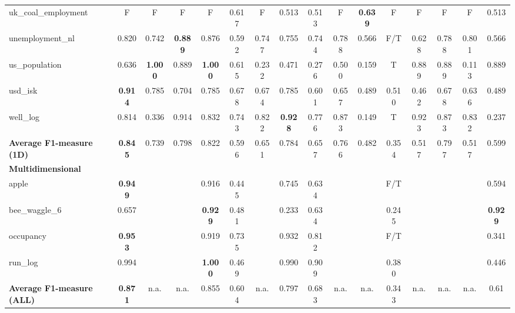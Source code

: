 \begin{table}
{\begin{tabular}{l|c|cccccccccccccc}
    \cellcolor{gray!100}uk\_coal\_employment & \cellcolor{gray!100}F & \cellcolor{gray!100}F & \cellcolor{gray!100}F & \cellcolor{gray!100}F & \cellcolor{gray!100}0.617 & \cellcolor{gray!100}F & \cellcolor{gray!100}0.513 & \cellcolor{gray!100}0.513 & \cellcolor{gray!100}F & \cellcolor{gray!100}\textbf{0.639} & \cellcolor{gray!100}F & \cellcolor{gray!100}F & \cellcolor{gray!100}F & \cellcolor{gray!100}F & \cellcolor{gray!100}0.513\\
    
    unemployment\_nl & 0.820 & 0.742 & \textbf{0.889} & 0.876 & 0.592 & 0.747 & 0.755 & 0.744 & 0.788 & 0.566 & F/T & 0.628 & 0.788 & 0.801 & 0.566\\
    
    us\_population & 0.636 & \textbf{1.000} & 0.889 & \textbf{1.000} & 0.615 & 0.232 & 0.471 & 0.276 & 0.500 & 0.159 & T & 0.889 & 0.889 & 0.113 & 0.889\\
    
    usd\_isk & \textbf{0.914} & 0.785 & 0.704 & 0.785 & 0.678 & 0.674 & 0.785 & 0.601 & 0.657 & 0.489 & 0.510 & 0.462 & 0.678 & 0.636 & 0.489\\
    
    well\_log & 0.814 & 0.336 & 0.914 & 0.832 & 0.743 & 0.822 & \textbf{0.928} & 0.776 & 0.873 & 0.149 & T & 0.923 & 0.873 & 0.832 & 0.237\\
    
    \midrule

    \textbf{Average F1-measure (1D)} & \textbf{0.845} & 0.739 & 0.798 & 0.822 & 0.596 & 0.651 & 0.784 & 0.657 & 0.766 & 0.482 & 0.354 & 0.517 & 0.797 & 0.517 & 0.599\\
    
    \midrule

    \multicolumn{16}{l}{\textbf{Multidimensional}} \\

    \midrule
    
    apple & \textbf{0.949} &  &  & 0.916 & 0.445 &  & 0.745 & 0.634 &  &  & F/T &  &  &  & 0.594\\
    
    bee\_waggle\_6 & 0.657 &  &  & \textbf{0.929} & 0.481 &  & 0.233 & 0.634 &  &  & 0.245 &  &  &  & \textbf{0.929}\\
    
    occupancy & \textbf{0.953} &  &  & 0.919 & 0.735 &  & 0.932 & 0.812 &  &  & F/T &  &  &  & 0.341\\
    
    run\_log & 0.994 &  &  & \textbf{1.000} & 0.469 &  & 0.990 & 0.909 &  &  & 0.380 &  &  &  & 0.446\\
    
    \midrule

    \textbf{Average F1-measure (ALL)} & \textbf{0.871} & n.a. & n.a. & 0.855 & 0.604 & n.a. & 0.797 & 0.683 & n.a. & n.a. & 0.343 & n.a. & n.a. & n.a. & 0.61\\
    \bottomrule
    \end{tabular}}
\end{table}

